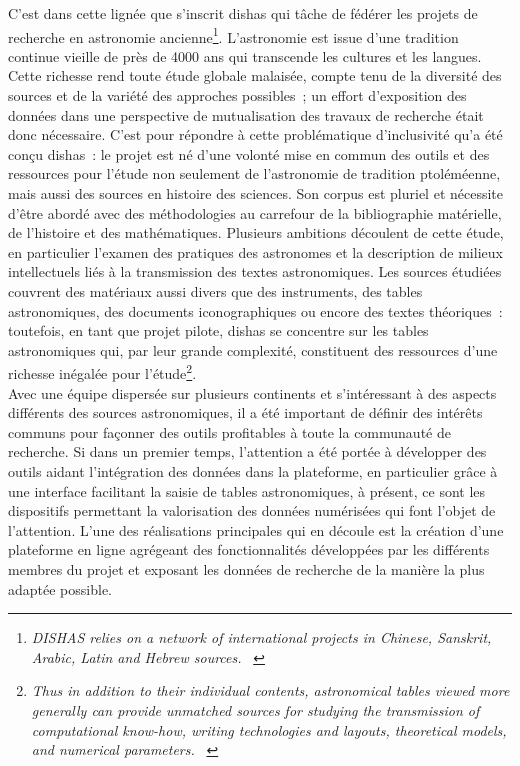 \documentclass[a4paper,12pt,twoside]{book}
\newcommand{\eng}{\emph}
\newcommand{\g}[1]{\og#1~\fg}
\newcommand{\dishas}{\gls{dishas}\xspace}
\begin{document}
C'est dans cette lignée que s'inscrit \dishas qui tâche de fédérer les projets de recherche en astronomie ancienne\footnote{\g{\eng{DISHAS relies on a network of international projects in Chinese, Sanskrit, Arabic, Latin and Hebrew sources.}} \cite{DISHASProjectAstronomical}}. L'astronomie est issue d'une tradition continue vieille de près de 4000 ans qui transcende les cultures et les langues. Cette richesse rend toute étude globale malaisée, compte tenu de la diversité des sources et de la variété des approches possibles~; un effort d'exposition des données dans une perspective de mutualisation des travaux de recherche était donc nécessaire. C'est pour répondre à cette problématique d'inclusivité qu'a été conçu \dishas~: le projet est né d'une volonté mise en commun des outils et des ressources pour l'étude non seulement de l'astronomie de tradition ptoléméenne, mais aussi des sources en histoire des sciences. Son corpus est pluriel et nécessite d'être abordé avec des méthodologies au carrefour de la bibliographie matérielle, de l'histoire et des mathématiques. Plusieurs ambitions découlent de cette étude, en particulier l'examen des pratiques des astronomes et la description de milieux intellectuels liés à la transmission des textes astronomiques. Les sources étudiées couvrent des matériaux aussi divers que des instruments, des tables astronomiques, des documents iconographiques ou encore des textes théoriques~: toutefois, en tant que projet pilote, \dishas se concentre sur les tables astronomiques qui, par leur grande complexité, constituent des ressources d'une richesse inégalée pour l'étude\footnote{\g{\eng{Thus in addition to their individual contents, astronomical tables viewed more generally can provide unmatched sources for studying the transmission of computational know-how, writing technologies and layouts, theoretical models, and numerical parameters.}} \cite{DISHASProjectAstronomical}}.\\

Avec une équipe dispersée sur plusieurs continents et s'intéressant à des aspects différents des sources astronomiques, il a été important de définir des intérêts communs pour façonner des outils profitables à toute la communauté de recherche. Si dans un premier temps, l'attention a été portée à développer des outils aidant l'intégration des données dans la plateforme, en particulier grâce à une interface facilitant la saisie de tables astronomiques, à présent, ce sont les dispositifs permettant la valorisation des données numérisées qui font l'objet de l'attention. L'une des réalisations principales qui en découle est la création d'une plateforme en ligne agrégeant des fonctionnalités développées par les différents membres du projet et exposant les données de recherche de la manière la plus adaptée possible.\\
\end{document}
